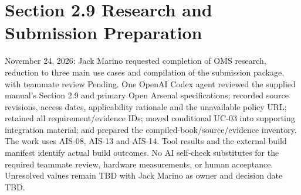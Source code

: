 \section{Section 2.9 Research and Submission Preparation}
November 24, 2026: Jack Marino requested completion of OMS research, reduction
to three main use cases and compilation of the submission package, with
teammate review Pending. One OpenAI Codex agent reviewed the supplied manual's
Section 2.9 and primary Open Arsenal specifications; recorded source revisions,
access dates, applicability rationale and the unavailable policy URL; retained
all requirement/evidence IDs; moved conditional UC-03 into supporting integration
material; and prepared the compiled-book/source/evidence inventory. The work
uses AIS-08, AIS-13 and AIS-14. Tool results and the external build manifest
identify actual build outcomes. No AI self-check substitutes for the required
teammate review, hardware measurements, or human acceptance. Unresolved
values remain TBD with Jack Marino as owner and decision date TBD.
